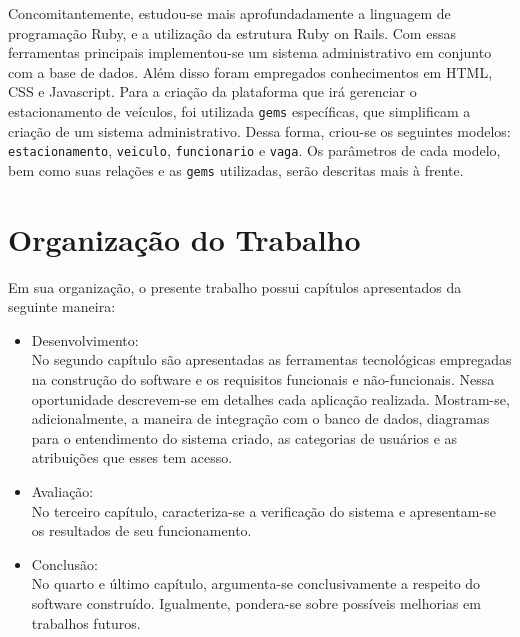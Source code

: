 Concomitantemente, estudou-se mais aprofundadamente a linguagem de programação Ruby, e a utilização da estrutura Ruby on Rails. Com essas ferramentas principais  implementou-se um sistema administrativo em conjunto com a base de dados. Além disso foram empregados
conhecimentos em HTML, CSS e Javascript. 
Para a criação da plataforma que irá gerenciar o estacionamento de veículos, foi utilizada \texttt{gems} específicas, que simplificam a criação de um sistema administrativo. Dessa forma, criou-se  os seguintes modelos: \texttt{estacionamento}, \texttt{veiculo}, \texttt{funcionario} e \texttt{vaga}. Os parâmetros de cada modelo, bem como suas relações e as \texttt{gems} utilizadas, serão descritas mais à frente.

\section{Organização do Trabalho}
Em sua organização, o presente trabalho possui capítulos apresentados da seguinte maneira:
\begin{itemize}
	\item Desenvolvimento:\\
	No segundo capítulo são apresentadas as ferramentas tecnológicas empregadas na construção do software e os requisitos funcionais e não-funcionais. Nessa oportunidade descrevem-se em  detalhes cada aplicação realizada. Mostram-se, adicionalmente, a maneira de integração com o banco de dados, diagramas para o entendimento do sistema criado, as categorias de usuários e as atribuições que esses tem acesso.  
	\item Avaliação:\\
	No terceiro capítulo, caracteriza-se a verificação do sistema e apresentam-se os resultados de seu funcionamento. 
	\item Conclusão:\\
	No quarto e último capítulo, argumenta-se conclusivamente a respeito do software construído. Igualmente, pondera-se sobre possíveis melhorias em trabalhos futuros.
\end{itemize}







